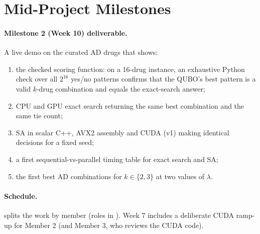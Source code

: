 \section{Mid-Project Milestones}
\label{sec:milestones}

\paragraph{Milestone 2 (Week 10) deliverable.} A live demo on the curated AD drugs that shows:
\begin{enumerate}
\item the checked scoring function: on a 16-drug instance, an exhaustive Python check over all $2^{16}$ yes/no patterns confirms that the QUBO's best pattern is a valid $k$-drug combination and equals the exact-search answer;
\item CPU and GPU exact search returning the same best combination and the same tie count;
\item SA in scalar C++, AVX2 assembly and CUDA (v1) making identical decisions for a fixed seed;
\item a first sequential-vs-parallel timing table for exact search and SA;
\item the first best AD combinations for $k\in\{2,3\}$ at two values of $\lambda$.
\end{enumerate}

\paragraph{Schedule.}  splits the work by member (roles in ). Week 7 includes a deliberate CUDA ramp-up for Member 2 (and Member 3, who reviews the CUDA code).

